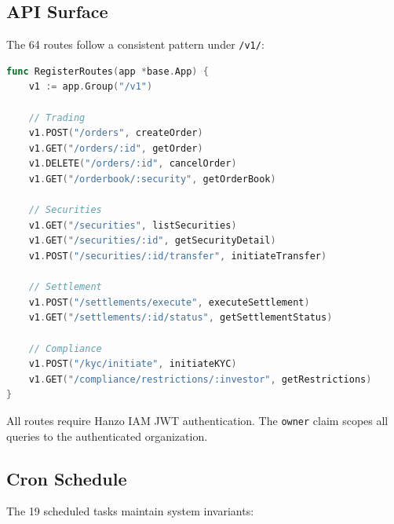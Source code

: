 \subsection{API Surface}

The 64 routes follow a consistent pattern under \texttt{/v1/}:

\begin{lstlisting}[language=Go,caption={Route registration pattern.}]
func RegisterRoutes(app *base.App) {
    v1 := app.Group("/v1")

    // Trading
    v1.POST("/orders", createOrder)
    v1.GET("/orders/:id", getOrder)
    v1.DELETE("/orders/:id", cancelOrder)
    v1.GET("/orderbook/:security", getOrderBook)

    // Securities
    v1.GET("/securities", listSecurities)
    v1.GET("/securities/:id", getSecurityDetail)
    v1.POST("/securities/:id/transfer", initiateTransfer)

    // Settlement
    v1.POST("/settlements/execute", executeSettlement)
    v1.GET("/settlements/:id/status", getSettlementStatus)

    // Compliance
    v1.POST("/kyc/initiate", initiateKYC)
    v1.GET("/compliance/restrictions/:investor", getRestrictions)
}
\end{lstlisting}

All routes require Hanzo IAM JWT authentication. The \texttt{owner} claim scopes all queries to the authenticated organization.

\subsection{Cron Schedule}

The 19 scheduled tasks maintain system invariants:

